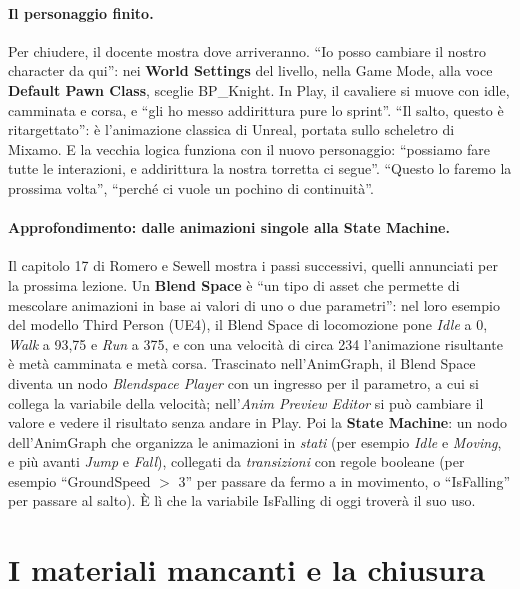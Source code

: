 \paragraph{Il personaggio finito.} Per chiudere, il docente mostra dove arriveranno.
``Io posso cambiare il nostro character da qui'': nei \textbf{World Settings} del livello,
nella Game Mode, alla voce \textbf{Default Pawn Class}, sceglie BP\_Knight. In Play, il
cavaliere si muove con idle, camminata e corsa, e ``gli ho messo addirittura pure lo
sprint''. ``Il salto, questo è ritargettato'': è l'animazione classica di Unreal, portata
sullo scheletro di Mixamo. E la vecchia logica funziona con il nuovo personaggio:
``possiamo fare tutte le interazioni, e addirittura la nostra torretta ci segue''.
``Questo lo faremo la prossima volta'', ``perché ci vuole un pochino di continuità''.

\paragraph{Approfondimento: dalle animazioni singole alla State Machine.} Il capitolo 17
di Romero e Sewell mostra i passi successivi, quelli annunciati per la prossima lezione.
Un \textbf{Blend Space} è ``un tipo di asset che permette di mescolare animazioni in base
ai valori di uno o due parametri'': nel loro esempio del modello Third Person (UE4), il
Blend Space di locomozione pone \emph{Idle} a 0, \emph{Walk} a 93,75 e \emph{Run} a 375,
e con una velocità di circa 234 l'animazione risultante è metà camminata e metà corsa.
Trascinato nell'AnimGraph, il Blend Space diventa un nodo \emph{Blendspace Player} con un
ingresso per il parametro, a cui si collega la variabile della velocità; nell'\emph{Anim
Preview Editor} si può cambiare il valore e vedere il risultato senza andare in Play.
Poi la \textbf{State Machine}: un nodo dell'AnimGraph che organizza le animazioni in
\emph{stati} (per esempio \emph{Idle} e \emph{Moving}, e più avanti \emph{Jump} e
\emph{Fall}), collegati da \emph{transizioni} con regole booleane (per esempio
``GroundSpeed $>$ 3'' per passare da fermo a in movimento, o ``IsFalling'' per passare
al salto). È lì che la variabile IsFalling di oggi troverà il suo uso.

\section{I materiali mancanti e la chiusura}
\label{ue8:sec:chiusura}

